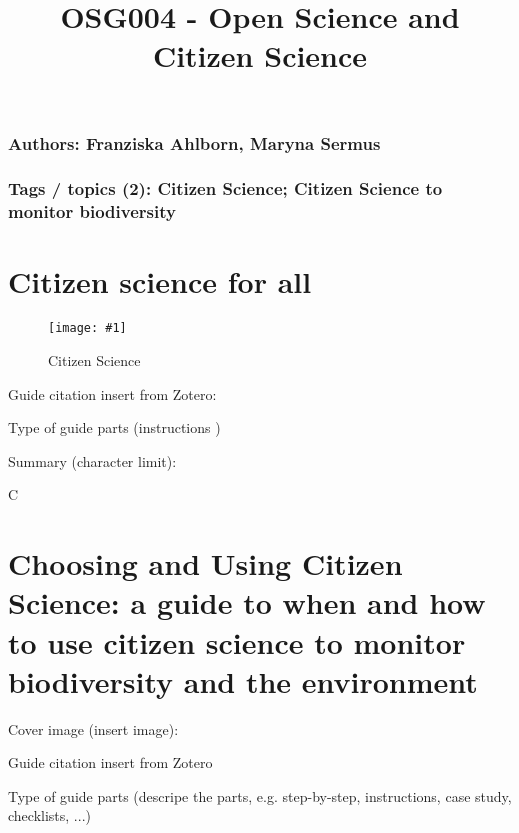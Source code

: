 \documentclass{article}
\newlength{\imgwidth}
\newcommand\scaledgraphics[2]{%
                
\settowidth{\imgwidth}{\texttt{[image: \#1]}}%
                
\setlength{\imgwidth}{\minof{\imgwidth}{#2\textwidth}}%
                
\texttt{[image: \#1]}%
                
}
\begin{document}
\title{OSG004 - Open Science and Citizen Science}

\maketitle





\subsubsection{\textbf{Authors: Franziska Ahlborn, Maryna Sermus}}\label{H1731420}



\subsubsection{\textbf{Tags / topics (2): Citizen Science; Citizen Science to monitor biodiversity}}\label{H5470699}



\section{Citizen science for all}\label{H2662301}



\begin{center}
\begin{figure}
\scaledgraphics{3cbbd8ed-7495-46a8-8cb5-114cf95cfb83.png}{0.25}
\caption*{Citizen Science}\label{F38618731}
\end{figure}


\end{center}


Guide citation insert from Zotero: \autocite{noauthor_citizen_2016}


Type of guide parts (instructions )


Summary (character limit): 


C





\section{Choosing and Using Citizen Science: a guide to when and how to use citizen science to monitor biodiversity and the environment}\label{H1285339}



Cover image (insert image):


Guide citation insert from Zotero \autocite{pocock_choosing_2014}  


Type of guide parts (descripe the parts, e.g. step-by-step, instructions, case study, checklists, ...)





\printbibliography[title={Literaturverzeichnis}]
\end{document}
